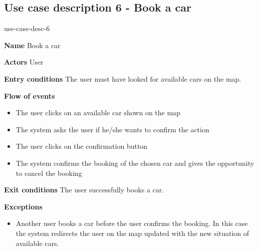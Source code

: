 \subsection{Use case description 6 - Book a car}
\begin{labeling}{use-case-desc-6}
		\item[\textbf{Name}] Book a car
		\item[\textbf{Actors}] User
		\item[\textbf{Entry conditions}] The user must have looked for available cars on the map.
		\item[\textbf{Flow of events}]
			\begin{itemize}
				\item[]
				\item The user clicks on an available car shown on the map
				\item The system asks the user if he/she wants to confirm the action
				\item The user clicks on the confirmation button
				\item The system confirms the booking of the chosen car and gives the opportunity to cancel the booking
			\end{itemize}
		\item[\textbf{Exit conditions}] The user successfully books a car.
		\item[\textbf{Exceptions}]
			\begin{itemize}
				\item[]
				\item Another user books a car before the user confirms the booking. In this case the system redirects the user on the map updated with the new situation of available cars.
			\end{itemize}
	\end{labeling}